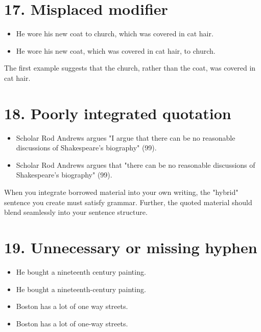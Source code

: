 \section{17. Misplaced modifier}
\begin{itemize}
\item He wore his new coat to church, which was covered in cat hair. 

\item He wore his new coat, which was covered in cat hair, to church. 
\end{itemize}

\noindent The first example suggests that the church, rather than the coat, was covered in cat hair.




\section{18. Poorly integrated quotation} 

\begin{itemize}
\item Scholar Rod Andrews argues "I argue that there can be no 
reasonable discussions of Shakespeare's biography" (99). 

\item Scholar Rod Andrews argues that "there can be no reasonable discussions 
of Shakespeare's biography" (99). 
\end{itemize}

\noindent When you integrate borrowed material into your own writing, the 
"hybrid" sentence you create must satisfy grammar. Further, the quoted material should
blend seamlessly into your sentence structure.

\section{19. Unnecessary or missing hyphen} 
\begin{itemize}
\item He bought a nineteenth century painting. 

\item He bought a nineteenth-century painting. 

\item Boston has a lot of one way streets. 

\item Boston has a lot of one-way streets. 
\end{itemize}

